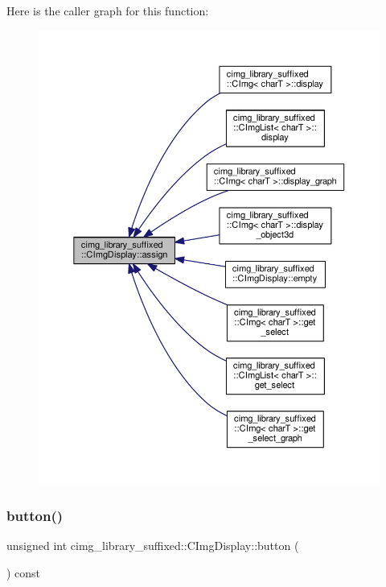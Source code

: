 Here is the caller graph for this function\+:
\nopagebreak
\begin{figure}[H]
\begin{center}
\leavevmode
\includegraphics[width=350pt]{d5/d53/structcimg__library__suffixed_1_1CImgDisplay_a93447fdffa6c250ebc03e62e9279d603_icgraph}
\end{center}
\end{figure}
\mbox{\label{structcimg__library__suffixed_1_1CImgDisplay_a78f937ad8000675d0293a8d7e20627fa}} 
\subsubsection{\texorpdfstring{button()}{button()}}
{\footnotesize\ttfamily unsigned int cimg\+\_\+library\+\_\+suffixed\+::\+C\+Img\+Display\+::button (\begin{DoxyParamCaption}{ }\end{DoxyParamCaption}) const\hspace{0.3cm}{\ttfamily [inline]}}



